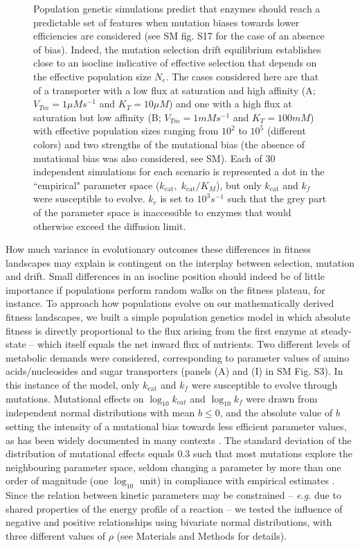 \documentclass[nogrid,crop,final]{MBE2}%
\newcommand{\othercaption}[1]{\caption{\setlength{\baselineskip}{1.5\baselineskip}#1}}
\begin{document}
\begin{figure}[h!]
\begin{minipage}[c]{0.46\linewidth}
\end{minipage}
\othercaption{Population genetic simulations predict that enzymes should reach a predictable set of features when mutation biases towards lower efficiencies are considered (see SM  fig. S17 for the case of an absence of bias). Indeed, the mutation selection drift equilibrium establishes close to an isocline indicative of effective selection that depends on the effective population size $N_e$. The cases considered here are that of a transporter with a low flux at saturation and high affinity (A; $V_{Tm}=1\mu Ms^{-1}$ and $K_T=10\mu M$) and one with a high flux at saturation but low affinity (B; $V_{Tm}=1mMs^{-1}$ and $K_T=100mM$) with effective population sizes ranging from $10^2$ to $10^5$ (different colors) and two strengths of the mutational bias (the absence of mutational bias was also considered, see SM). Each of 30 independent simulations for each scenario is represented a dot in the ``empirical" parameter space ($k_\text{cat}, \;k_\text{cat}/K_M$), but only $k_\text{cat}$ and $k_f$ were susceptible to evolve. $k_r$ is set to $10^3s^{-1}$ such that the grey part of the parameter space is inaccessible to enzymes that would otherwise exceed the diffusion limit. 
}
\label{figure2D_Evolutionary_results}
\end{figure}

How much variance in evolutionary outcomes these differences in fitness landscapes may explain is contingent on the interplay between selection, mutation and drift. Small differences in an isocline position should indeed be of little importance if populations perform random walks on the fitness plateau, for instance. To approach how populations evolve on our mathematically derived fitness landscapes, we built a simple population genetics model in which absolute fitness is directly proportional to the flux arising from the first enzyme at steady-state -- which itself equals the net inward flux of nutrients. Two different levels of metabolic demands were considered, corresponding to parameter values of amino acids/nucleosides and sugar transporters (panels (A) and (I) in SM Fig. S3). In this instance of the model, only $k_\text{cat}$ and $k_f$ were susceptible to evolve through mutations. Mutational effects on $\log_{10}k_{cat}$ and $\log_{10}k_f$ were drawn from independent normal distributions with mean $b \leq 0$, and the absolute value of $b$ setting the intensity of a mutational bias towards less efficient parameter values, as has been widely documented in many contexts \citep{EyreWalker07,Serohijos12,Heckmann18}. The standard deviation of the distribution of mutational effects equals $0.3$ such that most mutations explore the neighbouring parameter space,  seldom changing a parameter by more than one order of magnitude (one $\log_{10}$ unit) in compliance with empirical estimates \citep{Carlin16}. Since the relation between kinetic parameters may be constrained -- \textit{e.g.} due to shared properties of the energy profile of a reaction -- we tested the influence of negative and positive relationships using bivariate normal distributions, with three different values of $\rho$ (see Materials and Methods for details). 
\end{document}
